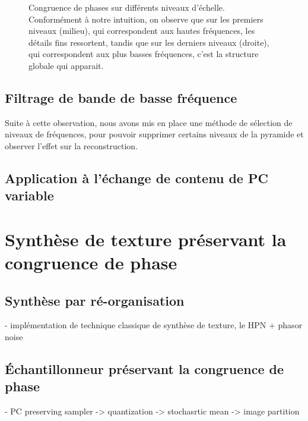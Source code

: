 \begin{figure}
    \caption[Congruence de phases sur différents niveaux d'échelle]{Congruence de phases sur différents niveaux d'échelle. Conformément à notre intuition, on observe que sur les premiers niveaux (milieu), qui correspondent aux hautes fréquences, les détails fins ressortent, tandis que sur les derniers niveaux (droite), qui correspondent aux plus basses fréquences, c'est la structure globale qui apparait.}
    \label{fig:pc-selection-niveaux}
\end{figure}


\subsection{Filtrage de bande de basse fréquence}

Suite à cette observation, nous avons mis en place une méthode de sélection de niveaux de fréquences, pour pouvoir supprimer certains niveaux de la pyramide et observer l'effet sur la reconstruction.

\subsection{Application à l'échange de contenu de PC variable}

\section{Synthèse de texture préservant la congruence de phase}

\subsection{Synthèse par ré-organisation}

- implémentation de technique classique de synthèse de texture, le HPN + phasor noise


\subsection{Échantillonneur préservant la congruence de phase}

- PC preserving sampler
-> quantization
-> stochasrtic mean
-> image partition